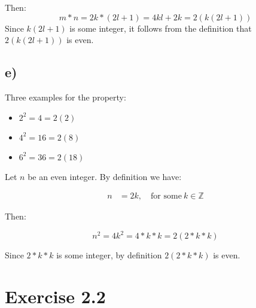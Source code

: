 \documentclass{article}
\begin{document}
Then:
\begin{equation*}
	m * n = 2k * (2l + 1) = 4kl + 2k = 2(k(2l + 1))
\end{equation*}
\noindent
Since $k(2l + 1)$ is some integer, it follows from the definition that $2(k(2l + 1))$ is
even.


\subsection*{e)}


Three examples for the property:

\begin{itemize}
	\item $2^2=4=2(2)$
	\item $4^2 = 16 = 2(8)$
	\item $6^2 = 36 = 2(18)$
\end{itemize}


Let $n$ be an even integer. By definition we have:

\begin{align*}
	n &= 2k, \quad \mbox{for some}\ k \in \mathbb{Z}
\end{align*}

Then:

\begin{equation*}
	n^2 = 4k^2 = 4 * k * k = 2(2*k*k)
\end{equation*}

Since $2*k*k$ is some integer, by definition $2(2*k*k)$ is even.


\section*{Exercise 2.2}
\end{document}
